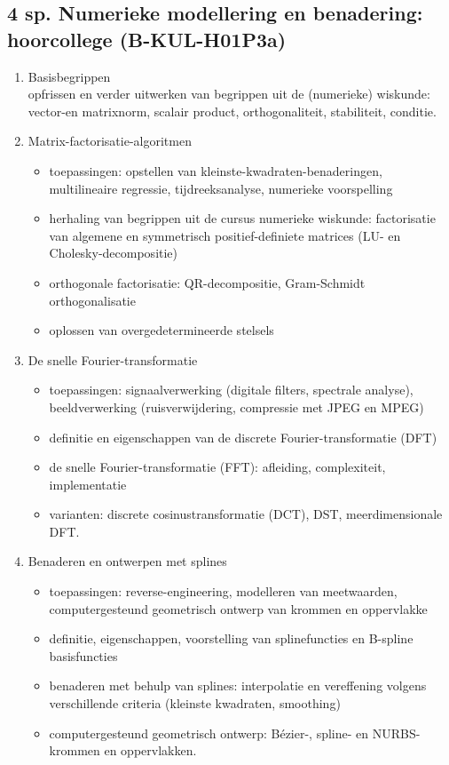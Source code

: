 \subsection*{4 sp. Numerieke modellering en benadering: hoorcollege (B-KUL-H01P3a)}
\begin{enumerate}
	\item Basisbegrippen \\
	      opfrissen en verder uitwerken van begrippen uit de (numerieke) wiskunde: vector-en matrixnorm, scalair product, orthogonaliteit, stabiliteit, conditie.

	\item Matrix-factorisatie-algoritmen
	      \begin{itemize}
		      \item toepassingen: opstellen van kleinste-kwadraten-benaderingen, multilineaire regressie, tijdreeksanalyse, numerieke voorspelling
		      \item herhaling van begrippen uit de cursus numerieke wiskunde:
		            factorisatie van algemene en symmetrisch positief-definiete matrices (LU- en Cholesky-decompositie)
		      \item orthogonale factorisatie: QR-decompositie, Gram-Schmidt orthogonalisatie
		      \item oplossen van overgedetermineerde stelsels
	      \end{itemize}

	\item De snelle Fourier-transformatie
	      \begin{itemize}
		      \item toepassingen: signaalverwerking (digitale filters, spectrale analyse), beeldverwerking (ruisverwijdering, compressie met JPEG en MPEG)
		      \item definitie en eigenschappen van de discrete Fourier-transformatie (DFT)
		      \item de snelle Fourier-transformatie (FFT): afleiding, complexiteit, implementatie
		      \item varianten: discrete cosinustransformatie (DCT), DST, meerdimensionale DFT.
	      \end{itemize}

	\item Benaderen en ontwerpen met splines
	      \begin{itemize}
		      \item toepassingen: reverse-engineering, modelleren van meetwaarden, computergesteund geometrisch ontwerp van krommen en oppervlakke
		      \item definitie, eigenschappen, voorstelling van splinefuncties en B-spline basisfuncties
		      \item benaderen met behulp van splines: interpolatie en vereffening volgens verschillende criteria (kleinste kwadraten, smoothing)
		      \item computergesteund geometrisch ontwerp: Bézier-, spline- en NURBS-krommen en oppervlakken.
	      \end{itemize}


\end{enumerate}

